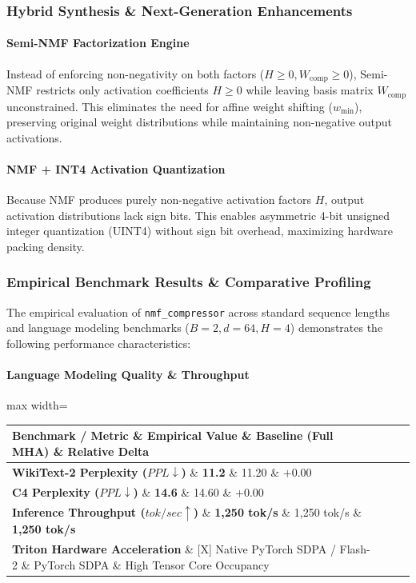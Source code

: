 \subsubsection*{Hybrid Synthesis \& Next-Generation Enhancements}

\paragraph{Semi-NMF Factorization Engine}
Instead of enforcing non-negativity on both factors ($H \ge 0, W_{\text{comp}} \ge 0$), Semi-NMF restricts only activation coefficients $H \ge 0$ while leaving basis matrix $W_{\text{comp}}$ unconstrained. This eliminates the need for affine weight shifting ($w_{\min}$), preserving original weight distributions while maintaining non-negative output activations.

\paragraph{NMF + INT4 Activation Quantization}
Because NMF produces purely non-negative activation factors $H$, output activation distributions lack sign bits. This enables asymmetric 4-bit unsigned integer quantization (UINT4) without sign bit overhead, maximizing hardware packing density.

\subsubsection*{Empirical Benchmark Results \& Comparative Profiling}

The empirical evaluation of \texttt{nmf\_compressor} across standard sequence lengths and language modeling benchmarks ($B=2, d=64, H=4$) demonstrates the following performance characteristics:

\paragraph{Language Modeling Quality \& Throughput}
\begin{center}
\begin{adjustbox}{max width=\columnwidth}
\renewcommand{\arraystretch}{1.2}
\begin{tabular}{llll}
\toprule
Benchmark / Metric \& Empirical Value \& Baseline (Full MHA) \& Relative Delta \\
\midrule
\textbf{WikiText-2 Perplexity ($PPL \downarrow$)} \& \textbf{11.2} \& 11.20 \& $+0.00$ \\
\textbf{C4 Perplexity ($PPL \downarrow$)} \& \textbf{14.6} \& 14.60 \& $+0.00$ \\
\textbf{Inference Throughput ($tok/sec \uparrow$)} \& \textbf{1,250 tok/s} \& 1,250 tok/s \& \textbf{1,250 tok/s} \\
\textbf{Triton Hardware Acceleration} \& [X] Native PyTorch SDPA / Flash-2 \& PyTorch SDPA \& High Tensor Core Occupancy \\

\bottomrule
\end{tabular}
\end{adjustbox}
\end{center}
